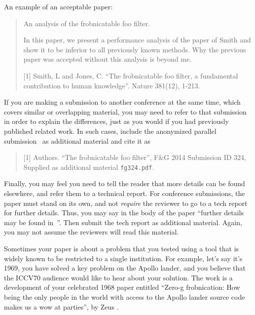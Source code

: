 \documentclass[10pt,twocolumn,letterpaper]{article}
\begin{document}
An example of an acceptable paper:

\begin{quote}
\begin{center}
     An analysis of the frobnicatable foo filter.
\end{center}

   In this paper, we present a performance analysis of the
   paper of Smith \etal [1] and show it to be inferior to
   all previously known methods.  Why the previous paper
   was accepted without this analysis is beyond me.

   [1] Smith, L and Jones, C. ``The frobnicatable foo
   filter, a fundamental contribution to human knowledge''.
   Nature 381(12), 1-213.
\end{quote}

If you are making a submission to another conference at the same time,
which covers similar or overlapping material, you may need to refer to that
submission in order to explain the differences, just as you would if you
had previously published related work.  In such cases, include the
anonymized parallel submission~\cite{Authors14} as additional material and
cite it as
\begin{quote}
[1] Authors. ``The frobnicatable foo filter'', F\&G 2014 Submission ID 324,
Supplied as additional material {\tt fg324.pdf}.
\end{quote}

Finally, you may feel you need to tell the reader that more details can be
found elsewhere, and refer them to a technical report.  For conference
submissions, the paper must stand on its own, and not {\em require} the
reviewer to go to a tech report for further details.  Thus, you may say in
the body of the paper ``further details may be found
in~\cite{Authors14b}''.  Then submit the tech report as additional material.
Again, you may not assume the reviewers will read this material.

Sometimes your paper is about a problem that you tested using a tool that
is widely known to be restricted to a single institution.  For example,
let's say it's 1969, you have solved a key problem on the Apollo lander,
and you believe that the ICCV70 audience would like to hear about your
solution.  The work is a development of your celebrated 1968 paper entitled
``Zero-g frobnication: How being the only people in the world with access to
the Apollo lander source code makes us a wow at parties'', by Zeus \etal.
\end{document}
